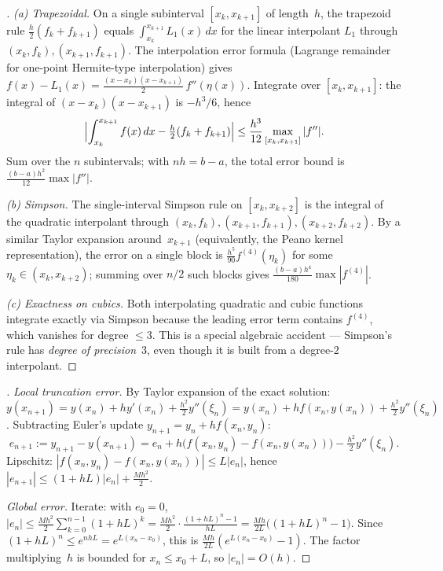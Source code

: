 \begin{proof}[]
\emph{(a) Trapezoidal.} On a single subinterval $[x_k, x_{k+1}]$ of
length~$h$, the trapezoid rule
$\tfrac{h}{2}(f_k + f_{k+1})$ equals $\int_{x_k}^{x_{k+1}} L_1(x)\, dx$
for the linear interpolant $L_1$ through $(x_k, f_k), (x_{k+1}, f_{k+1})$.
The interpolation error formula (Lagrange remainder for one-point
Hermite-type interpolation) gives
$f(x) - L_1(x) = \tfrac{(x - x_k)(x - x_{k+1})}{2}\, f''(\eta(x))$.
Integrate over $[x_k, x_{k+1}]$: the integral of
$(x - x_k)(x - x_{k+1})$ is $-h^3/6$, hence
\[
  \Bigl| \int_{x_k}^{x_{k+1}} f(x)\, dx - \tfrac{h}{2}(f_k + f_{k+1}) \Bigr|
  \leq \frac{h^3}{12} \max_{[x_k, x_{k+1}]} |f''|.
\]
Sum over the $n$ subintervals; with $n h = b - a$, the total error
bound is $\tfrac{(b - a) h^2}{12} \max |f''|$.

\emph{(b) Simpson.} The single-interval Simpson rule on $[x_k, x_{k+2}]$
is the integral of the quadratic interpolant through
$(x_k, f_k), (x_{k+1}, f_{k+1}), (x_{k+2}, f_{k+2})$. By a similar
Taylor expansion around~$x_{k+1}$ (equivalently, the Peano kernel
representation), the error on a single block is
$\tfrac{h^5}{90} f^{(4)}(\eta_k)$ for some
$\eta_k \in (x_k, x_{k+2})$; summing over $n/2$ such blocks gives
$\tfrac{(b - a) h^4}{180} \max |f^{(4)}|$.

\emph{(c) Exactness on cubics.} Both interpolating quadratic and
cubic functions integrate exactly via Simpson because the leading
error term contains $f^{(4)}$, which vanishes for degree $\leq 3$.
This is a special algebraic accident — Simpson's rule has \emph{degree
of precision}~$3$, even though it is built from a degree-$2$
interpolant.
\end{proof}

\begin{proof}[]
\emph{Local truncation error.} By Taylor expansion of the exact
solution:
$y(x_{n+1}) = y(x_n) + h y'(x_n) + \tfrac{h^2}{2} y''(\xi_n)
            = y(x_n) + h f(x_n, y(x_n)) + \tfrac{h^2}{2} y''(\xi_n)$.
Subtracting Euler's update $y_{n+1} = y_n + h f(x_n, y_n)$:
\[
  e_{n+1} := y_{n+1} - y(x_{n+1}) = e_n + h \bigl(f(x_n, y_n) - f(x_n, y(x_n))\bigr) - \tfrac{h^2}{2} y''(\xi_n).
\]
Lipschitz: $|f(x_n, y_n) - f(x_n, y(x_n))| \leq L |e_n|$, hence
$|e_{n+1}| \leq (1 + h L) |e_n| + \tfrac{M h^2}{2}$.

\emph{Global error.} Iterate: with $e_0 = 0$,
$|e_n| \leq \tfrac{M h^2}{2} \sum_{k=0}^{n-1} (1 + h L)^k
        = \tfrac{M h^2}{2} \cdot \tfrac{(1 + h L)^n - 1}{h L}
        = \tfrac{M h}{2 L} \bigl((1 + h L)^n - 1\bigr)$.
Since $(1 + h L)^n \leq e^{n h L} = e^{L (x_n - x_0)}$, this is
$\tfrac{M h}{2 L} (e^{L (x_n - x_0)} - 1)$. The factor multiplying~$h$
is bounded for $x_n \leq x_0 + L$, so $|e_n| = O(h)$.
\end{proof}

